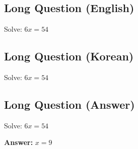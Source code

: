 \cleardoublepage
\subsection*{Long Question (English)}
Solve: $6x = 54$


\newpage
\subsection*{Long Question (Korean)}
Solve: $6x = 54$


\newpage
\subsection*{Long Question (Answer)}
Solve: $6x = 54$

\textbf{Answer:} $x = 9$
